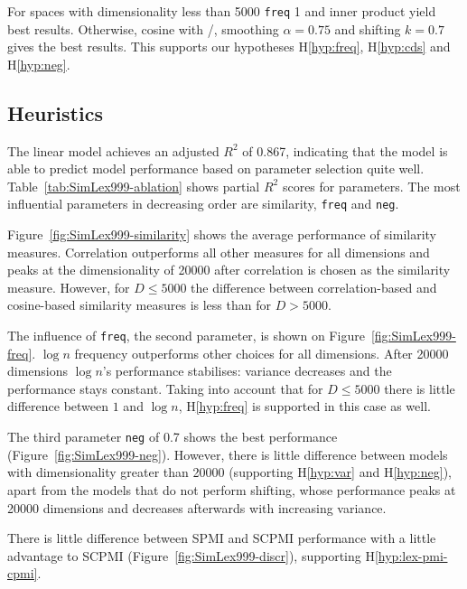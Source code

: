 For spaces with dimensionality less than 5000 \texttt{freq} 1 and inner product yield best results. Otherwise, cosine with \logNSCPMI/, smoothing $\alpha=0.75$ and shifting $k=0.7$ gives the best results. This supports our hypotheses H\ref{hyp:freq}, H\ref{hyp:cds} and H\ref{hyp:neg}.



\subsection{Heuristics}
\label{sec:heuristics-simlex}



% 

The linear model achieves an adjusted $R^2$ of 0.867, indicating that the model is able to predict model performance based on parameter selection quite well. Table~\ref{tab:SimLex999-ablation} shows partial $R^2$ scores for parameters. The most influential parameters in decreasing order are similarity, \texttt{freq} and \texttt{neg}.


Figure~\ref{fig:SimLex999-similarity} shows the average performance of similarity measures. Correlation outperforms all other measures for all dimensions and peaks at the dimensionality  of 20000 after correlation is chosen as the similarity measure. However, for $D \leq 5000$ the difference between correlation-based and cosine-based similarity measures is less than for $D > 5000$.

The influence of \texttt{freq}, the second parameter, is shown on Figure~\ref{fig:SimLex999-freq}. $\log n$ frequency outperforms other choices for all dimensions. After 20000 dimensions $\log n$'s performance stabilises: variance decreases and the performance stays constant. Taking into account that for $D \leq 5000$ there is little difference between $1$ and $\log n$, H\ref{hyp:freq} is supported in this case as well.


The third parameter \texttt{neg} of 0.7 shows the best performance (Figure~\ref{fig:SimLex999-neg}). However, there is little difference between models with dimensionality greater than 20000 (supporting H\ref{hyp:var} and H\ref{hyp:neg}), apart from the models that do not perform shifting, whose performance peaks at 20000 dimensions and decreases afterwards with increasing variance.

% 
There is little difference between SPMI and SCPMI performance with a little advantage to SCPMI (Figure~\ref{fig:SimLex999-discr}), supporting H\ref{hyp:lex-pmi-cpmi}.

